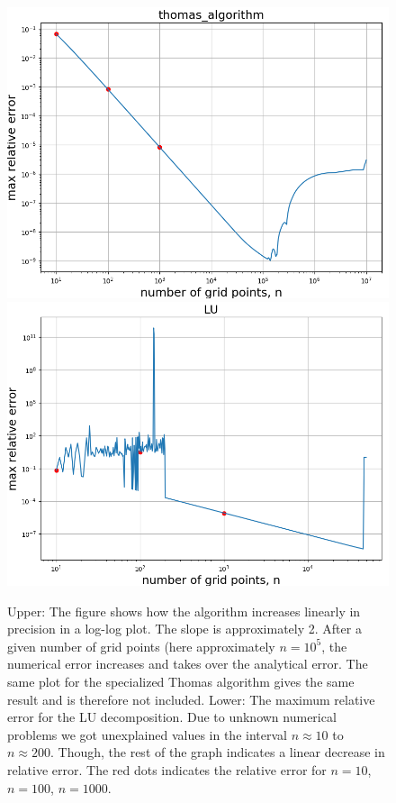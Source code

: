 \documentclass{emulateapj}
\begin{document}
        
        \begin{figure}[t]
            \centering
            \includegraphics[scale=0.38]{error_data.png}
            \includegraphics[scale=0.38]{error_data_LU.png}
            \caption{Upper: The figure shows how the algorithm increases linearly in precision in a log-log plot. The slope is approximately 2. After a given number of grid points (here approximately \(n=10^{5}\), the numerical error increases and takes over the analytical error. The same plot for the specialized Thomas algorithm gives the same result and is therefore not included. Lower: The maximum relative error for the LU decomposition. Due to unknown numerical problems we got unexplained values in the interval $n \approx 10$ to $n \approx 200$. Though, the rest of the graph indicates a linear decrease in relative error. The red dots indicates the relative error for $n=10$, $n=100$, $n=1000$.}
            \label{fig:error_data}
        \end{figure}
\end{document}
